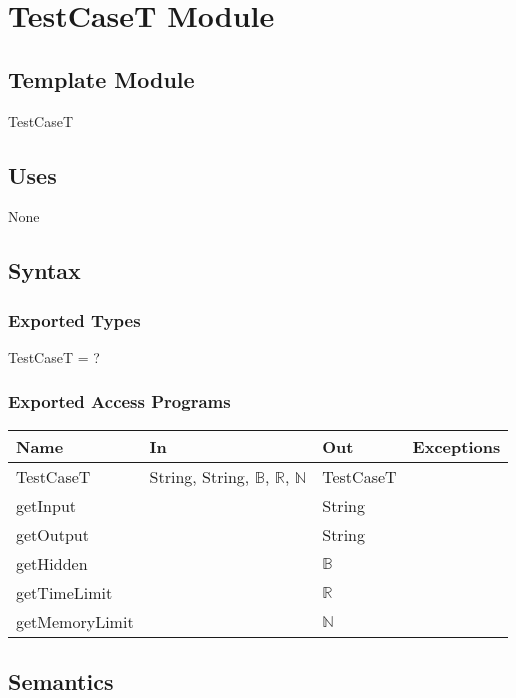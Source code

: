 \documentclass[12pt, titlepage]{article}
\begin{document}
\section{TestCaseT Module} \label{TestCaseT} 

\subsection{Template Module}

TestCaseT

\subsection{Uses}

None

\subsection{Syntax}

\subsubsection{Exported Types}

TestCaseT = ?

\subsubsection{Exported Access Programs}

\begin{center}
\begin{tabular}{ |  p{4cm} | p{3cm} |  p{3cm} | p{5cm} | }
\hline
\textbf{Name} & \textbf{In} & \textbf{Out} & \textbf{Exceptions} \\
\hline
TestCaseT & String, String, $\mathbb{B}$, $\mathbb{R}$, $\mathbb{N}$ & TestCaseT & \\
getInput & & String & \\
getOutput & & String & \\
getHidden & & $\mathbb{B}$ & \\
getTimeLimit & & $\mathbb{R}$  & \\
getMemoryLimit & & $\mathbb{N}$ & \\

\hline
\end{tabular}
\end{center}

\subsection{Semantics}
\end{document}
